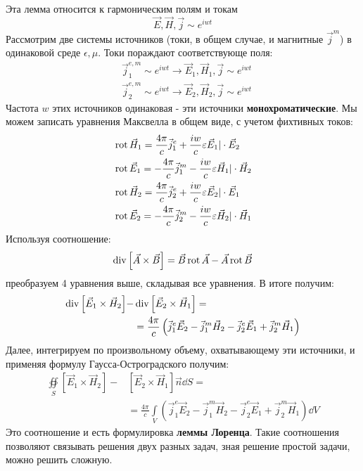 Эта лемма относится к гармоническим полям и токам
\begin{equation}
	\vec{E},\vec{H},\vec{j}\sim e^{iwt}
\end{equation}
Рассмотрим две системы источников (токи, в общем случае, и магнитные $\vec{j}^m$) в одинаковой среде $\epsilon,\mu$.
Токи пораждают соответствующе поля:
\begin{align*}
	&\vec{j}^{e,m}_1 \sim e^{iwt} \rightarrow \vec{E}_1,\vec{H}_1,\vec{j}\sim e^{iwt}\\
	&\vec{j}^{e,m}_2 \sim e^{iwt} \rightarrow \vec{E}_2,\vec{H}_2,\vec{j}\sim e^{iwt}
\end{align*}
Частота $w$ этих источников одинаковая - эти источники \textbf{монохроматические}. Мы можем записать уравнения Максвелла
в общем виде, с учетом фихтивных токов:
\begin{align*}
	&\operatorname{rot}{\vec{H}_1} = \frac{4\pi}{c}\vec{j}^{e}_1 + \frac{iw}{c}\varepsilon\vec{E}_1|\cdot\vec{E}_2\\
	&\operatorname{rot}{\vec{E}_1} = -\frac{4\pi}{c}\vec{j}^{m}_1 - \frac{iw}{c}\varepsilon\vec{H}_1|\cdot\vec{H}_2\\
	&\operatorname{rot}{\vec{H}_2} = \frac{4\pi}{c}\vec{j}^{e}_2 + \frac{iw}{c}\varepsilon\vec{E}_2|\cdot\vec{E}_1\\
	&\operatorname{rot}{\vec{E}_2} = -\frac{4\pi}{c}\vec{j}^{m}_2 - \frac{iw}{c}\varepsilon\vec{H}_2|\cdot\vec{H}_1
\end{align*}
Используя соотношение:
\begin{equation}
	\operatorname{div}{\left[\vec{A} \times \vec{B} \right]} = \vec{B}\operatorname{rot}{\vec{A}} - \vec{A}\operatorname{rot}{\vec{B}}
\end{equation}
преобразуем 4 уравнения выше, складывая все уравнения. В итоге получим:
\begin{align*}
	\operatorname{div}{\left[\vec{E}_1 \times \vec{H}_2\right]} - &\operatorname{div}{\left[\vec{E}_2 \times \vec{H}_1\right]} = \\
	& = \frac{4\pi}{c}\left( \vec{j}^{e}_1 \vec{E}_2-\vec{j}^{m}_1 \vec{H}_2-\vec{j}^{e}_2 \vec{E}_1+\vec{j}^{m}_2 \vec{H}_1 \right)
\end{align*}
Далее, интегрируем по произвольному объему, охватывающему эти источники, и применяя формулу Гаусса-Остроградского
получим:
\begin{align*}
	\oiint \limits_S \left[\vec{E}_1 \times \vec{H}_2 \right] - &\left[ \vec{E}_2 \times \vec{H}_1\right] \vec{n} \dd S =\\
	&=\frac{4 \pi}{c} \int \limits_V \left( \vec{j}^{e}_1 \vec{E}_2-\vec{j}^{m}_1 \vec{H}_2-\vec{j}^{e}_2 \vec{E}_1+\vec{j}^{m}_2 \vec{H}_1 \right) \dd V
\end{align*}
Это соотношение и есть формулировка \textbf{леммы Лоренца}. Такие соотношения позволяют связывать решения двух разных
задач, зная решение простой задачи, можно решить сложную.

